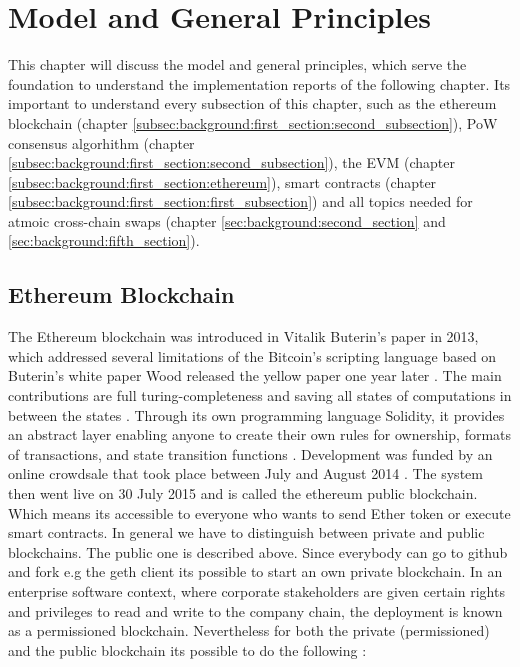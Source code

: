 \chapter{Model and General Principles}
\label{ch:background}

This chapter will discuss the model and general principles, which serve the foundation to understand the implementation reports of the following chapter. Its important to understand every subsection of this chapter, such as the ethereum blockchain (chapter \ref{subsec:background:first_section:second_subsection}), \ac{PoW} consensus algorhithm (chapter \ref{subsec:background:first_section:second_subsection}), the \ac{EVM} (chapter \ref{subsec:background:first_section:ethereum}), smart contracts (chapter \ref{subsec:background:first_section:first_subsection}) and all topics needed for atmoic cross-chain swaps (chapter \ref{sec:background:second_section} and \ref{sec:background:fifth_section}). 


%
%
\section{Ethereum Blockchain}
\label{sec:background:first_section}
The Ethereum blockchain was introduced in Vitalik Buterin’s paper in 2013, which addressed several limitations of the Bitcoin’s scripting language \cite{buterin2013ethereum} based on Buterin's white paper Wood released the yellow paper one year later \cite{wood2014ethereum}. The main contributions are full turing-completeness and saving all states of computations in between the states \cite{dannen2017introducing}.
Through its own programming language Solidity, it provides an abstract layer enabling anyone to create their own rules for ownership, formats of transactions, and state transition functions \cite{vujivcic2018blockchain}. Development was funded by an online crowdsale that took place between July and August 2014 \cite{tapscott2016blockchain}. The system then went live on 30 July 2015  and is called the ethereum public blockchain. Which means its accessible to everyone who wants to send Ether token or execute smart contracts. In general we have to distinguish between private and public blockchains. The public one is described above. Since everybody can go to github and fork e.g the geth client its possible to start an own private blockchain. In an enterprise software context, where corporate stakeholders are given certain rights and privileges to read and write to the company chain, the deployment is known as a permissioned blockchain. Nevertheless for both the private (permissioned) and the public blockchain its possible to do the following \cite{dannen2017introducing}:

